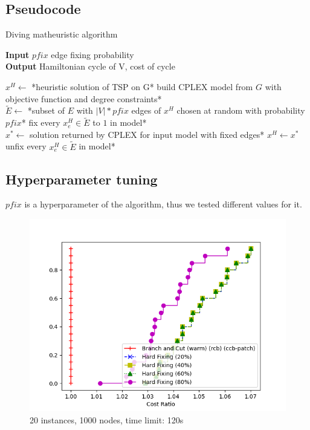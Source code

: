 \subsection{Pseudocode}
\begin{algorithm}[h]
    \caption{Diving matheuristic algorithm}
    \textbf{Input} $pfix$ edge fixing probability\\
    \textbf{Output} Hamiltonian cycle of V, cost of cycle\\
    \begin{algorithmic}

        \State $x^H \gets$ *heuristic solution of TSP on G*
        \State *build CPLEX model from $G$ with objective function and degree constraints*\\
        \State $\tilde{E} \gets$ *subset of $E$ with $|V|*pfix$ edges of $x^H$ chosen at random with probability $pfix$*
        \State *fix every $x_e^H\in\tilde{E}$ to $1$ in model*\\
        \State *$x^*\gets$ solution returned by CPLEX for input model with fixed edges*
        \State $x^H\gets x^*$
        \EndIf\\
        \State *unfix every $x_e^H\in\tilde{E}$ in model*
        \EndWhile

    \end{algorithmic}
\end{algorithm}
\FloatBarrier

\subsection{Hyperparameter tuning}

$pfix$ is a hyperparameter of the algorithm, thus we tested different values for it.

\begin{figure}[h]
    \centering
    \includegraphics*[width=.6\textwidth]{../plots/perfprof_hard_costs.png}
    \caption*{20 instances, 1000 nodes, time limit: 120s}
\end{figure}
\FloatBarrier

